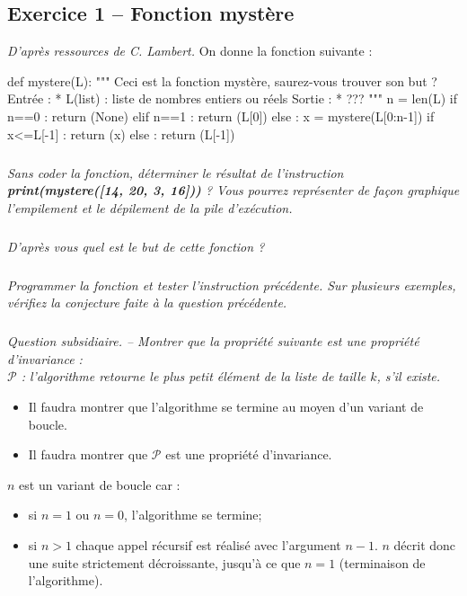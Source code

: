\documentclass[10pt,fleqn]{article} %
\begin{document}

\vspace{8cm}
\pagestyle{fancy}
\thispagestyle{plain}


\def\columnseprulecolor{\color{ocre}}
\setlength{\columnseprule}{0.4pt} 
\ifprof
\else
\begin{multicols}{2}
\fi

\subsection*{Exercice 1 -- Fonction mystère}
\textit{D'après ressources de C. Lambert.}
On donne la fonction suivante : 
\begin{py}
\begin{python}
def mystere(L):
    """
    Ceci est la fonction mystère, saurez-vous trouver 
    son but ?
    Entrée : 
        * L(list) : liste de nombres entiers ou réels
    Sortie : 
        * ??? 
    """
    n = len(L)
    if n==0 :
        return (None)
    elif n==1 :
        return (L[0])
    else :
        x = mystere(L[0:n-1])
        if x<=L[-1] :
            return (x)
        else : 
            return (L[-1])
\end{python}
\end{py}

\subparagraph{}
\textit{Sans coder la fonction, déterminer le résultat de l'instruction \textbf{print(mystere([14, 20, 3, 16]))} ? Vous pourrez représenter de façon graphique l'empilement et le dépilement de la pile d'exécution.}

\subparagraph{}
\textit{D'après vous quel est le but de cette fonction ?}

\subparagraph{}
\textit{Programmer la fonction et tester l'instruction précédente. Sur plusieurs exemples, vérifiez la conjecture faite à la question précédente.}


\subparagraph{}
\textit{Question subsidiaire. -- Montrer que la propriété suivante est une propriété d'invariance :\\
$\mathcal{P}$ : l'algorithme retourne le plus petit élément de la liste de taille $k$, s'il existe.}

\begin{rem}
\begin{itemize}
\item Il faudra montrer que l'algorithme se termine au moyen d'un variant de boucle. 
\item Il faudra montrer que $\mathcal{P}$ est une propriété d'invariance. 
\end{itemize}
\end{rem}
\ifprof
\begin{corrige}
$n$ est un variant de boucle car : 
\begin{itemize}
\item si $n=1$ ou $n=0$, l'algorithme se termine;
\item si $n>1$ chaque appel récursif est réalisé avec l'argument $n-1$. $n$ décrit donc une suite strictement décroissante, jusqu'à ce que $n=1$ (terminaison de l'algorithme). 
\end{itemize}


\end{corrige}
\end{multicols}
\end{document}
